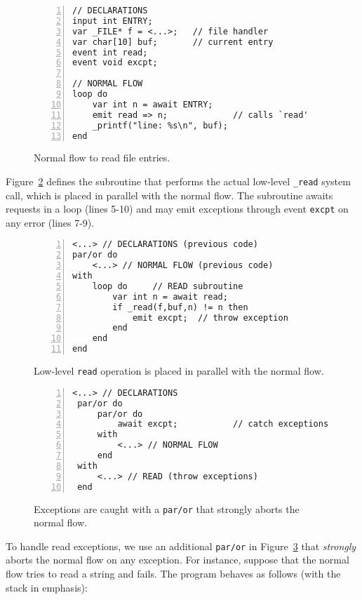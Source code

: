 \documentclass{acm_proc_article-sp}
\newcommand{\code}[1] {{\small{\texttt{#1}}}}
\newcommand{\1}{\;}
\newcommand{\2}{\;\;}
\newcommand{\3}{\;\;\;}
\newcommand{\5}{\;\;\;\;\;}
\begin{document}
\begin{figure}[t]
\begin{lstlisting}[numbers=left,xleftmargin=2em]
// DECLARATIONS
input int ENTRY;
var _FILE* f = <...>;   // file handler
var char[10] buf;       // current entry
event int read;
event void excpt;

// NORMAL FLOW
loop do
    var int n = await ENTRY;
    emit read => n;             // calls `read'
    _printf("line: %s\n", buf);
end
\end{lstlisting}
\caption{ Normal flow to read file entries.
\label{lst.excpt1}
}
\end{figure}

Figure~\ref{lst.excpt2} defines the subroutine that performs the actual 
low-level \code{\_read} system call, which is placed in parallel with the 
normal flow.
The subroutine awaits requests in a loop (lines 5-10) and may emit
exceptions through event \code{excpt} on any error (lines 7-9).

\begin{figure}[t]
\begin{lstlisting}[numbers=left,xleftmargin=2em]
<...> // DECLARATIONS (previous code)
par/or do
    <...> // NORMAL FLOW (previous code)
with
    loop do     // READ subroutine
        var int n = await read;
        if _read(f,buf,n) != n then
            emit excpt;  // throw exception
        end
    end
end
\end{lstlisting}
\caption{ Low-level \code{read} operation is placed in parallel with the normal 
flow.
\label{lst.excpt2}
}
\end{figure}

\begin{figure}[t]
\begin{lstlisting}[numbers=left,xleftmargin=2em]
 <...> // DECLARATIONS
 par/or do
     par/or do
         await excpt;           // catch exceptions
     with
         <...> // NORMAL FLOW
     end
 with
     <...> // READ (throw exceptions)
 end
\end{lstlisting}
\caption{ Exceptions are caught with a \code{par/or} that strongly aborts the 
normal flow.
\label{lst.excpt3}
}
\end{figure}

To handle read exceptions, we use an additional \code{par/or} in 
Figure~\ref{lst.excpt3} that \emph{strongly} aborts the normal flow on any 
exception.
For instance, suppose that the normal flow tries to read a string and fails.
The program behaves as follows (with the stack in emphasis):
\end{document}
